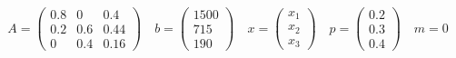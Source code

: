 \documentclass[a4]{article}
\begin{document}
\[A=\begin{pmatrix}
    0.8 & 0 & 0.4 \\
    0.2 & 0.6 & 0.44 \\
    0 & 0.4 & 0.16
  \end{pmatrix}\quad b=\begin{pmatrix}
    1500 \\ 715 \\ 190
  \end{pmatrix}\quad x=\begin{pmatrix}
    x_1 \\ x_2 \\ x_3
  \end{pmatrix}\quad p=\begin{pmatrix}
    0.2 \\ 0.3 \\ 0.4
  \end{pmatrix}\quad m=0
\]
\end{document}
